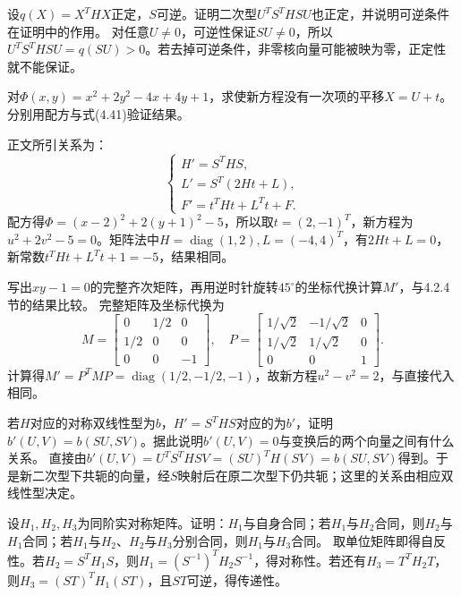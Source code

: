 设\(q(X)=X^THX\)正定，\(S\)可逆。证明二次型\(U^TS^THSU\)也正定，并说明可逆条件在证明中的作用。
\solutionanswer
对任意\(U\ne0\)，可逆性保证\(SU\ne0\)，所以\(U^TS^THSU=q(SU)>0\)。若去掉可逆条件，非零核向量可能被映为零，正定性就不能保证。


对\(\Phi(x,y)=x^2+2y^2-4x+4y+1\)，求使新方程没有一次项的平移\(X=U+t\)。分别用配方与式\textup{(4.41)}验证结果。

\par\smallskip\noindent 正文所引关系为：
\begin{equation*}
\begin{cases}
        H'=S^THS ,\\
        L'=S^T(2Ht+L) ,\\
        F'=t^THt+L^Tt+F .
    \end{cases}
\end{equation*}
\solutionanswer
配方得\(\Phi=(x-2)^2+2(y+1)^2-5\)，所以取\(t=(2,-1)^T\)，新方程为\(u^2+2v^2-5=0\)。矩阵法中\(H=\operatorname{diag}(1,2),L=(-4,4)^T\)，有\(2Ht+L=0\)，新常数\(t^THt+L^Tt+1=-5\)，结果相同。


写出\(xy-1=0\)的完整齐次矩阵，再用逆时针旋转\(45^\circ\)的坐标代换计算\(M'\)，与4.2.4节的结果比较。
\solutionanswer
完整矩阵及坐标代换为
\[
M=\begin{bmatrix}0&1/2&0\\1/2&0&0\\0&0&-1\end{bmatrix},\quad
P=\begin{bmatrix}1/\sqrt2&-1/\sqrt2&0\\1/\sqrt2&1/\sqrt2&0\\0&0&1\end{bmatrix}.
\]
计算得\(M'=P^TMP=\operatorname{diag}(1/2,-1/2,-1)\)，故新方程\(u^2-v^2=2\)，与直接代入相同。


若\(H\)对应的对称双线性型为\(b\)，\(H'=S^THS\)对应的为\(b'\)，证明\(b'(U,V)=b(SU,SV)\)。据此说明\(b'(U,V)=0\)与变换后的两个向量之间有什么关系。
\solutionanswer
直接由\(b'(U,V)=U^TS^THSV=(SU)^TH(SV)=b(SU,SV)\)得到。于是新二次型下共轭的向量，经\(S\)映射后在原二次型下仍共轭；这里的关系由相应双线性型决定。


设\(H_1,H_2,H_3\)为同阶实对称矩阵。证明：\(H_1\)与自身合同；若\(H_1\)与\(H_2\)合同，则\(H_2\)与\(H_1\)合同；若\(H_1\)与\(H_2\)、\(H_2\)与\(H_3\)分别合同，则\(H_1\)与\(H_3\)合同。
\solutionanswer
取单位矩阵即得自反性。若\(H_2=S^TH_1S\)，则\(H_1=(S^{-1})^TH_2S^{-1}\)，得对称性。若还有\(H_3=T^TH_2T\)，则\(H_3=(ST)^TH_1(ST)\)，且\(ST\)可逆，得传递性。


